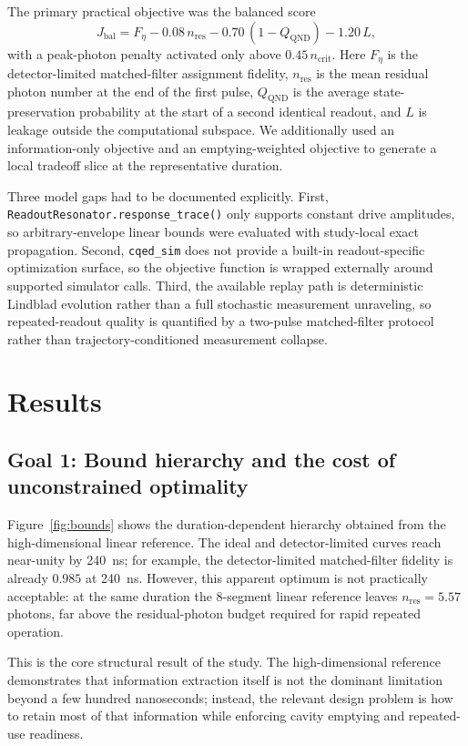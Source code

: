 \documentclass[11pt, a4paper]{article}
\begin{document}
The primary practical objective was the balanced score
\begin{equation}
J_{\mathrm{bal}} =
F_{\eta}
- 0.08\, n_{\mathrm{res}}
- 0.70\,(1-Q_{\mathrm{QND}})
- 1.20\,L,
\end{equation}
with a peak-photon penalty activated only above $0.45\,n_{\mathrm{crit}}$. Here
$F_\eta$ is the detector-limited matched-filter assignment fidelity,
$n_{\mathrm{res}}$ is the mean residual photon number at the end of the first pulse,
$Q_{\mathrm{QND}}$ is the average state-preservation probability at the start of a second
identical readout, and $L$ is leakage outside the computational subspace. We additionally
used an information-only objective and an emptying-weighted objective to generate a local
tradeoff slice at the representative duration.

Three model gaps had to be documented explicitly. First,
\texttt{ReadoutResonator.response\_trace()} only supports constant drive amplitudes, so
arbitrary-envelope linear bounds were evaluated with study-local exact propagation.
Second, \texttt{cqed\_sim} does not provide a built-in readout-specific optimization
surface, so the objective function is wrapped externally around supported simulator calls.
Third, the available replay path is deterministic Lindblad evolution rather than a full
stochastic measurement unraveling, so repeated-readout quality is quantified by a
two-pulse matched-filter protocol rather than trajectory-conditioned measurement collapse.

\section{Results}

\subsection{Goal 1: Bound hierarchy and the cost of unconstrained optimality}
Figure~\ref{fig:bounds} shows the duration-dependent hierarchy obtained from the
high-dimensional linear reference. The ideal and detector-limited curves reach near-unity
by \SI{240}{ns}; for example, the detector-limited matched-filter fidelity is already
$0.985$ at \SI{240}{ns}. However, this apparent optimum is not practically acceptable: at
the same duration the 8-segment linear reference leaves $n_{\mathrm{res}}=5.57$ photons,
far above the residual-photon budget required for rapid repeated operation.

This is the core structural result of the study. The high-dimensional reference
demonstrates that information extraction itself is not the dominant limitation beyond a few
hundred nanoseconds; instead, the relevant design problem is how to retain most of that
information while enforcing cavity emptying and repeated-use readiness.
\end{document}

